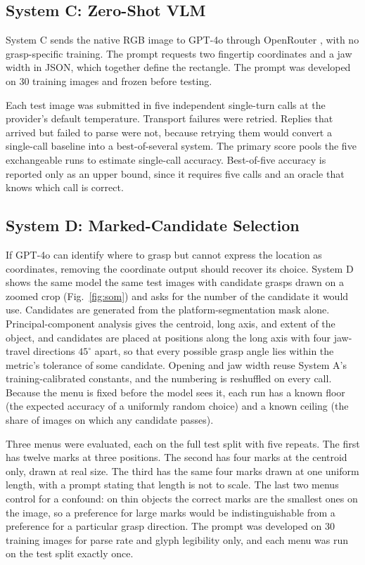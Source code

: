 \documentclass[10pt,conference,compsoc]{IEEEtran}
\begin{document}
\subsection{System C: Zero-Shot VLM}

System C sends the native RGB image to GPT-4o through OpenRouter
\cite{openai2024}, with no grasp-specific training. The prompt requests two
fingertip coordinates and a jaw width in JSON, which together define the
rectangle. The prompt was developed on 30 training images and frozen before
testing.

Each test image was submitted in five independent single-turn calls at the
provider's default temperature. Transport failures were retried. Replies that
arrived but failed to parse were not, because retrying them would convert a
single-call baseline into a best-of-several system. The primary score pools
the five exchangeable runs to estimate single-call accuracy. Best-of-five
accuracy is reported only as an upper bound, since it requires five calls and
an oracle that knows which call is correct.

\subsection{System D: Marked-Candidate Selection}

If GPT-4o can identify where to grasp but cannot express the location as
coordinates, removing the coordinate output should recover its choice. System
D shows the same model the same test images with candidate grasps drawn on a
zoomed crop (Fig.~\ref{fig:som}) and asks for the number of the candidate it
would use. Candidates are generated from the platform-segmentation mask
alone. Principal-component analysis gives the centroid, long axis, and
extent of the object, and candidates are placed at positions along the long
axis with four jaw-travel directions $45^\circ$ apart, so that every possible
grasp angle lies within the metric's tolerance of some candidate. Opening and
jaw width reuse System A's training-calibrated constants, and the numbering
is reshuffled on every call. Because the menu is fixed before the model sees
it, each run has a known floor (the expected accuracy of a uniformly random
choice) and a known ceiling (the share of images on which any candidate
passes).

Three menus were evaluated, each on the full test split with five repeats.
The first has twelve marks at three positions. The second has four marks at
the centroid only, drawn at real size. The third has the same four marks
drawn at one uniform length, with a prompt stating that length is not to
scale. The last two menus control for a confound: on thin objects the
correct marks are the smallest ones on the image, so a preference for large
marks would be indistinguishable from a preference for a particular grasp
direction. The prompt was developed on 30 training images for parse rate and
glyph legibility only, and each menu was run on the test split exactly once.
\end{document}
